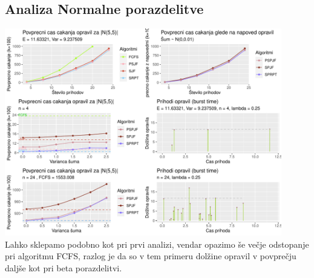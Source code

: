 \documentclass[a4paper, pt14]{article}
\begin{document}
\subsection{Analiza Normalne porazdelitve}

\includegraphics[width=12.1cm,keepaspectratio]{Normalna_grafi.pdf}
\\ Lahko sklepamo podobno kot pri prvi analizi, vendar opazimo \v se ve\v cje odstopanje pri algoritmu FCFS, razlog je da so v tem primeru dol\v zine opravil v povpre\v cju dalj\v se kot pri beta porazdelitvi. 
\end{document}
